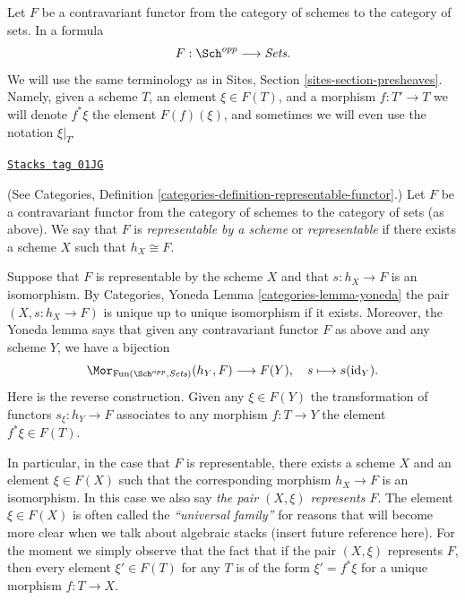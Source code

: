 \medskip\noindent
Let $F$ be a contravariant functor from the category
of schemes to the category of sets. In a formula
$$
F : \Sch^{opp}
\longrightarrow
\textit{Sets}.
$$
We will use the same terminology as in Sites, Section
\ref{sites-section-presheaves}. Namely, given a scheme
$T$, an element $\xi \in F(T)$, and a morphism $f : T' \to T$
we will denote $f^*\xi$ the element $F(f)(\xi)$, and sometimes
we will even use the notation $\xi|_{T'}$

\begin{definition}
\label{schemes-definition-representable-functor}
\href{https://stacks.math.columbia.edu/tag/01JG}{\texttt{Stacks tag 01JG}}

(See Categories, Definition \ref{categories-definition-representable-functor}.)
Let $F$ be a contravariant functor from the category
of schemes to the category of sets (as above).
We say that $F$ is {\it representable by a scheme}
or {\it representable} if there exists a scheme $X$
such that $h_X \cong F$.
\end{definition}

Suppose that $F$ is representable by the scheme $X$ and that
$s : h_X \to F$ is an isomorphism.
By Categories, Yoneda Lemma \ref{categories-lemma-yoneda}
the pair $(X, s : h_X \to F)$ is unique up to unique
isomorphism if it exists.
Moreover, the Yoneda lemma says that
given any contravariant functor $F$ as above
and any scheme $Y$, we have a bijection
$$
\Mor_{\text{Fun}(\Sch^{opp}, \textit{Sets})} (h_Y, F)
\longrightarrow
F(Y), \quad
s \longmapsto s(\text{id}_Y).
$$
Here is the reverse construction. Given any $\xi \in F(Y)$
the transformation of functors $s_\xi : h_Y \to F$
associates to any morphism $f : T \to Y$ the
element $f^*\xi \in F(T)$.

\medskip\noindent
In particular, in the case that $F$ is representable, there exists
a scheme $X$ and an element $\xi \in F(X)$ such that the corresponding
morphism $h_X \to F$ is an isomorphism.
In this case we also say {\it the pair $(X, \xi)$ represents $F$}.
The element $\xi \in F(X)$
is often called the {\it ``universal family''} for reasons that will become
more clear when we talk about algebraic stacks (insert future reference here).
For the moment we simply observe that the fact that if the pair $(X, \xi)$
represents $F$, then every element $\xi' \in F(T)$ for any $T$ is of
the form $\xi' = f^*\xi$ for a unique morphism $f : T \to X$.

